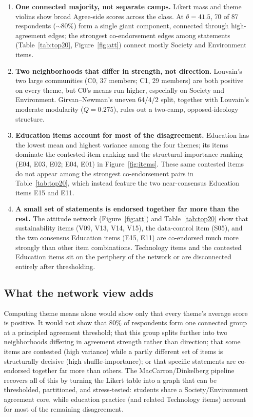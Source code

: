 \documentclass[10pt]{article}
\begin{document}
\begin{enumerate}
  \item \textbf{One connected majority, not separate camps.} Likert mass and theme
  violins show broad Agree-side scores across the class. At $\theta=41.5$, 70 of 87
  respondents ($\sim$80\%) form a single giant component, connected through
  high-agreement edges; the strongest co-endorsement edges among statements
  (Table~\ref{tab:top20}, Figure~\ref{fig:att}) connect mostly Society and Environment
  items.
  \item \textbf{Two neighborhoods that differ in strength, not direction.} Louvain's two
  large communities (C0, 37 members; C1, 29 members) are both positive on every theme,
  but C0's means run higher, especially on Society and Environment. Girvan--Newman's
  uneven 64/4/2 split, together with Louvain's moderate modularity ($Q=0.275$), rules out
  a two-camp, opposed-ideology structure.
  \item \textbf{Education items account for most of the disagreement.} Education has the
  lowest mean and highest variance among the four themes; its items dominate the
  contested-item ranking and the structural-importance ranking (E04, E03, E02; E04, E01)
  in Figure~\ref{fig:items}. These same contested items do not appear among the strongest
  co-endorsement pairs in Table~\ref{tab:top20}, which instead feature the two
  near-consensus Education items E15 and E11.
  \item \textbf{A small set of statements is endorsed together far more than the rest.}
  The attitude network (Figure~\ref{fig:att}) and Table~\ref{tab:top20} show that
  sustainability items (V09, V13, V14, V15), the data-control item (S05), and the two
  consensus Education items (E15, E11) are co-endorsed much more strongly than other item
  combinations. Technology items and the contested Education items sit on the periphery
  of the network or are disconnected entirely after thresholding.
\end{enumerate}

\subsection{What the network view adds}
Computing theme means alone would show only that every theme's average score is
positive. It would not show that 80\% of respondents form one connected group at a
principled agreement threshold; that this group splits further into two neighborhoods
differing in agreement strength rather than direction; that some items are contested
(high variance) while a partly different set of items is structurally decisive (high
shuffle-importance); or that specific statements are co-endorsed together far more than
others. The MacCarron/Dinkelberg pipeline recovers all of this by turning the Likert
table into a graph that can be thresholded, partitioned, and stress-tested: students
share a Society/Environment agreement core, while education practice (and related
Technology items) account for most of the remaining disagreement.
\end{document}
